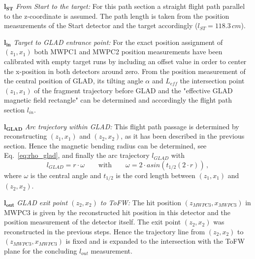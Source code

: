 \begin{description}
\item $\mathbf{l_{ST}}$ \textit{From Start to the target:} For this path section a straight flight path parallel to the z-coordinate is assumed. The path length is taken from the position measurements of the Start detector and the target accordingly ($ l_{ST} = 118.3\,cm$). 
\item $\mathbf{l_{in}}$ \textit{Target to GLAD entrance point:} For the exact position assignment of $(z_1,x_1)$ both MWPC1 and MWPC2 position measurements have been calibrated with empty target runs by including an offset value in order to center the x-position in both detectors around zero. From the position measurement of the central position of GLAD, its tilting angle $\alpha$ and $L_{eff}$ the intersection point $(z_1,x_1)$ of the fragment trajectory before GLAD and the "effective GLAD magnetic field rectangle" can be determined and accordingly the flight path section $l_{in}$.
\item $\mathbf{{l_{GLAD}}}$ \textit{Arc trajectory within GLAD:} This flight path passage is determined by reconstructing $(z_1,x_1)$ and $(z_2,x_2)$, as it has been described in the previous section. Hence the magnetic bending radius can be determined, see Eq.~\ref{eq:rho_glad}, and finally the arc trajectory ${l_{GLAD}}$ with
\begin{equation}\label{eq:arc}
l_{GLAD} = r \cdot \omega\qquad \text{with}\qquad \omega = 2\cdot asin(t_{1/2}{(2\cdot r)}) \, , 
\end{equation}
where $\omega$ is the central angle and  $t_{1/2}$ is the cord length between $(z_1,x_1)$ and $(z_2,x_2)$.
\item $\mathbf{l_{out}}$ \textit{GLAD exit point $(z_2,x_2)$ to ToFW:} The hit position $(z_{MWPC3},x_{MWPC3})$ in MWPC3 is given by the reconstructed hit position in this detector and the position measurement of the detector itself. The exit point $(z_2,x_2)$ was reconstructed in the previous steps. Hence the trajectory line from $(z_2,x_2)$ to $(z_{MWPC3},x_{MWPC3})$ is fixed and is expanded to the intersection with the ToFW plane for the concluding $l_{out}$ measurement.  
\end{description}


